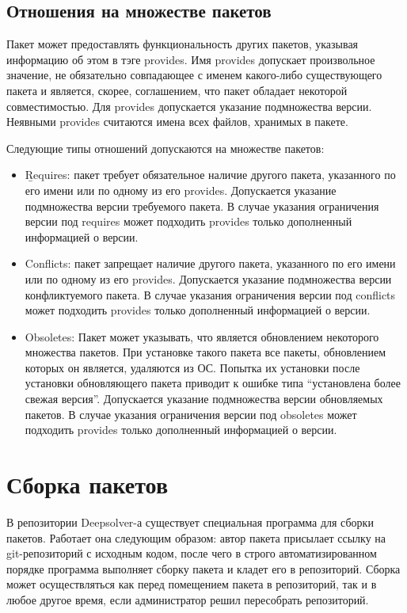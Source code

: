 \subsection {Отношения на множестве пакетов}
Пакет может предоставлять функциональность других пакетов, указывая
информацию об этом в тэге provides. Имя provides допускает произвольное
значение, не обязательно совпадающее с именем какого-либо существующего
пакета и является, скорее, соглашением, что пакет обладает некоторой
совместимостью. Для provides допускается указание подмножества версии.
Неявными provides считаются имена всех файлов, хранимых в пакете.

Следующие типы отношений допускаются на множестве пакетов:
\begin{itemize}
\item{\b Requires: пакет требует обязательное наличие другого пакета, указанного
по его имени или по одному из его provides. Допускается указание 
подмножества версии требуемого пакета. В случае указания ограничения версии
под requires может подходить provides только дополненный информацией
о версии.}
\item{Conflicts: пакет запрещает наличие другого пакета, указанного по его имени
 или по одному из его provides. Допускается указание подмножества
версии конфликтуемого пакета. В случае указания ограничения версии
под conflicts может подходить provides только дополненный информацией
о версии.}
\item{Obsoletes: Пакет может указывать, что является обновлением некоторого
множества пакетов. При установке такого пакета все пакеты, обновлением
которых он является, удаляются из ОС. Попытка их установки после
установки обновляющего пакета приводит к ошибке типа “установлена
более свежая версия”. Допускается указание подмножества версии обновляемых
пакетов. В случае указания ограничения версии под obsoletes может
подходить provides только дополненный информацией о версии.}
\end{itemize}

\section{Сборка пакетов}
В репозитории Deepsolver-а существует специальная программа для сборки пакетов. Работает
она следующим образом: автор пакета присылает ссылку на git-репозиторий с исходным кодом, %
после чего в строго автоматизированном порядке программа выполняет сборку пакета и кладет
его в репозиторий. Сборка может осуществляться как перед помещением пакета в репозиторий,
так и в любое другое время, если администратор решил пересобрать репозиторий.

